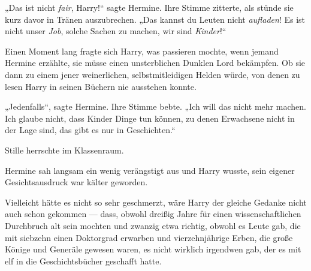 „Das ist nicht \emph{fair}, Harry!“ sagte Hermine. Ihre Stimme zitterte, als stünde sie kurz davor in Tränen auszubrechen.
„Das kannst du Leuten nicht \emph{aufladen}! Es ist nicht unser \emph{Job}, solche Sachen zu machen, wir sind \emph{Kinder}!“

Einen Moment lang fragte sich Harry, was passieren mochte, wenn jemand Hermine erzählte, sie müsse einen unsterblichen Dunklen Lord bekämpfen. Ob sie dann zu einem jener weinerlichen, selbstmitleidigen Helden würde, von denen zu lesen Harry in seinen Büchern nie ausstehen konnte.

„Jedenfalls“, sagte Hermine. Ihre Stimme bebte.
„Ich will das nicht mehr machen. Ich glaube nicht, dass Kinder Dinge tun können, zu denen Erwachsene nicht in der Lage sind, das gibt es nur in Geschichten.“

Stille herrschte im Klassenraum.

Hermine sah langsam ein wenig verängstigt aus und Harry wusste, sein eigener Gesichtsausdruck war kälter geworden.

Vielleicht hätte es nicht so sehr geschmerzt, wäre Harry der gleiche Gedanke nicht auch schon gekommen — dass, obwohl dreißig Jahre für einen wissenschaftlichen Durchbruch alt sein mochten und zwanzig etwa richtig, obwohl es Leute gab, die mit siebzehn einen Doktorgrad erwarben und vierzehnjährige Erben, die große Könige und Generäle gewesen waren, es nicht wirklich irgendwen gab, der es mit elf in die Geschichtsbücher geschafft hatte.

